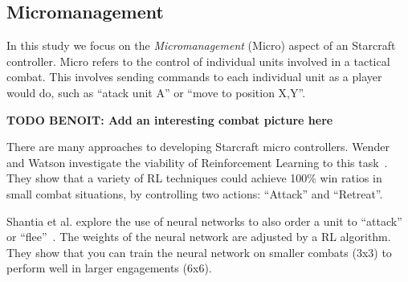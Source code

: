 
\subsection{Micromanagement}

In this study we focus on the \emph{Micromanagement} (Micro) aspect of
an Starcraft controller. Micro refers to the control of individual
units involved in a tactical combat. This involves sending commands to
each individual unit as a player would do, such as ``atack unit A'' or
``move to position X,Y''. 

{\bf TODO BENOIT: Add an interesting combat picture here}

There are many approaches to developing Starcraft micro
controllers. Wender and Watson investigate the viability of
Reinforcement Learning to this task~\cite{WeWa12}. They show that a
variety of RL techniques could achieve 100\% win ratios in small
combat situations, by controlling two actions: ``Attack'' and
``Retreat''.

Shantia et al. explore the use of neural networks to also order a unit
to ``attack'' or ``flee''~\cite{ShBeWi11}. The weights of the neural
network are adjusted by a RL algorithm. They show that you can train
the neural network on smaller combats (3x3) to perform well in larger
engagements (6x6).

